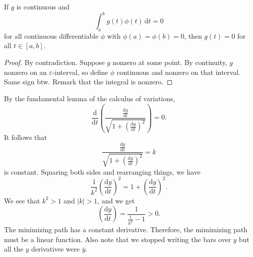\begin{lemma}
	If $g$ is continuous and
	\[
		\int_{a}^{b} g(t)\phi (t) \,\mathrm{d} t=0
	\]
	for all continuous differentiable $\phi $ with $\phi (a)=\phi (b)=0$, then $g(t)=0$ for all $t\in[a,b]$.
\end{lemma}
\begin{proof}
	By contradiction. Suppose $g$ nonzero at some point. By continuity, $g$ nonzero on an  $\varepsilon $-interval, so define $\phi  $ continuous and nonzero on that interval. Same sign btw. Remark that the integral is nonzero.
\end{proof}
By the fundamental lemma of the calculus of variations,
\[
	\frac{\mathrm{d}}{\mathrm{d}t} \left( \frac{\frac{\mathrm{d}y}{\mathrm{d}t} }{\sqrt{1+\left( \frac{\mathrm{d}y}{\mathrm{d}t}  \right) ^2} } \right) =0
.\]
It follows that
\[
	\frac{\frac{\mathrm{d}y}{\mathrm{d}t} }{\sqrt{1+\left( \frac{\mathrm{d}y}{\mathrm{d}t}  \right) ^2} }=k
\]
is constant. Squaring both sides and rearranging things, we have
\[
	\frac{1}{k^2}\left( \frac{\mathrm{d}y}{\mathrm{d}t}  \right) ^2=1+\left( \frac{\mathrm{d}y}{\mathrm{d}t}  \right) ^2
.\]
We see that $k^2>1$ and $\left| k \right| >1$, and we get
\[
	\left(\frac{\mathrm{d}y}{\mathrm{d}t}\right)=\frac{1}{\frac{1}{k^2}-1}>0
.\]
The minimizing path has a constant derivative. Therefore, the mimimizing path must be a linear function. Also note that we stopped writing the bars over $y$ but all the $y$ derivatives were $\overline{y} $.

